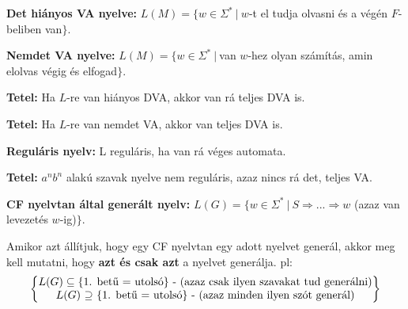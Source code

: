 \documentclass[a4paper]{article}
\begin{document}
\begin{tcolorbox}[size = fbox]
  \textbf{Det hiányos VA nyelve:} $L(M) = \{w \in \Sigma^{*}\ |\ w$-t el tudja olvasni és a végén $F$-beliben van$\}$.
\end{tcolorbox}

\begin{tcolorbox}[size = fbox]
  \textbf{Nemdet VA nyelve:} $L(M) = \{w \in \Sigma^{*}\ |\ $van $w$-hez olyan számítás, amin elolvas végig és elfogad$\}$.
\end{tcolorbox}

\begin{tcolorbox}[size = fbox]
  \textbf{Tetel:} Ha $L$-re van hiányos DVA, akkor van rá teljes DVA is.
\end{tcolorbox}

\begin{tcolorbox}[size = fbox]
  \textbf{Tetel:} Ha $L$-re van nemdet VA, akkor van teljes DVA is.
\end{tcolorbox}

\begin{tcolorbox}[size = fbox]
  \textbf{Reguláris nyelv:} L reguláris, ha van rá véges automata.
\end{tcolorbox}

\begin{tcolorbox}[size = fbox]
  \textbf{Tetel:} $a^{n}b^{n}$ alakú szavak nyelve nem reguláris, azaz nincs rá det, teljes VA.
\end{tcolorbox}

\begin{tcolorbox}[size = fbox]
  \textbf{CF nyelvtan által generált nyelv:} $L(G) = \{w \in \Sigma^{*}\ |\ S \Rightarrow ... \Rightarrow w$ (azaz van levezetés $w$-ig)$\}$.
\end{tcolorbox}

\begin{tcolorbox}[colback = yellow!20, colframe = yellow, size = fbox]
Amikor azt állítjuk, hogy egy CF nyelvtan egy adott nyelvet generál, akkor meg kell mutatni, hogy \textbf{azt és csak azt} a nyelvet generálja. pl: \\
\[
  \begin{Bmatrix} 
    L(G) \subseteq \{ \text{1. betű = utolsó} \} \text{ - (azaz csak ilyen szavakat tud generálni)} \\
    L(G)\ \text{\reflectbox{$\subseteq$}}\ \{ \text{1. betű = utolsó} \} \text{ - (azaz minden ilyen szót generál)}
  \end{Bmatrix}
\]
\end{tcolorbox}
\end{document}
